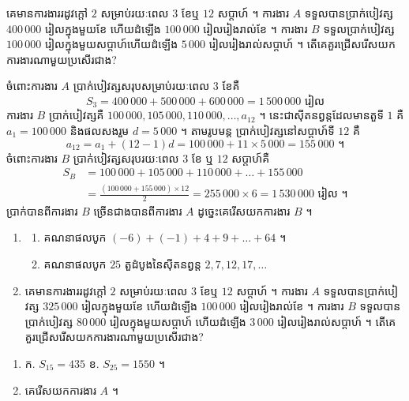 \begin{example}[លំហាត់គំរូ ៣]
គេមានការងាររដូវក្តៅ $2$ សម្រាប់រយៈពេល $3$ ខែឬ $12$ សប្តាហ៍ ។ ការងារ $A$ ទទួលបានប្រាក់បៀវត្ស $400\,000$ រៀលក្នុងមួយខែ ហើយដំឡើង $100\,000$ រៀលរៀងរាល់ខែ ។ ការងារ $B$ ទទួលប្រាក់បៀវត្ស $100\,000$ រៀលក្នុងមួយសប្តាហ៍ហើយដំឡើង $5\,000$ រៀលរៀងរាល់សប្តាហ៍ ។ តើគេគួរជ្រើសរើសយកការងារណាមួយប្រសើរជាង?
\end{example}
\ans
ចំពោះការងារ $A$ ប្រាក់បៀវត្សសរុបសម្រាប់រយៈពេល $3$ ខែគឺ
\[ S_3 = 400\,000 + 500\,000 + 600\,000 = 1\,500\,000 \text{ រៀល} \]
ការងារ $B$ ប្រាក់បៀវត្សគឺ $100\,000, 105\,000, 110\,000, \ldots, a_{12}$ ។ នេះជាស៊ីតនព្វន្តដែលមានតួទី $1$ គឺ $a_1 = 100\,000$ និងផលសងរួម $d = 5\,000$ ។ តាមរូបមន្ត ប្រាក់បៀវត្សនៅសប្តាហ៍ទី $12$ គឺ
\[ a_{12} = a_1 + (12 - 1)d = 100\,000 + 11 \times 5\,000 = 155\,000 \text{ ។} \]
ចំពោះការងារ $B$ ប្រាក់បៀវត្សសរុបរយៈពេល $3$ ខែ ឬ $12$ សប្តាហ៍គឺ
\[
\begin{aligned}
S_B &= 100\,000 + 105\,000 + 110\,000 + \ldots + 155\,000\\
&= \frac{(100\,000 + 155\,000) \times 12}{2} = 255\,000 \times 6 = 1\,530\,000 \text{ រៀល ។}
\end{aligned}
\]
ប្រាក់បានពីការងារ $B$ ច្រើនជាងបានពីការងារ $A$ ដូច្នេះគេរើសយកការងារ $B$ ។

\begin{pro}
\begin{enumerate}[1]
  \item \begin{enumerate}[a]
    \item គណនាផលបូក $(-6) + (-1) + 4 + 9 + \ldots + 64$ ។
    \item គណនាផលបូក $25$ តួដំបូងនៃស៊ីតនព្វន្ត $2, 7, 12, 17, \ldots$
  \end{enumerate}
  \item គេមានការងាររដូវក្តៅ $2$ សម្រាប់រយៈពេល $3$ ខែឬ $12$ សប្តាហ៍ ។ ការងារ $A$ ទទួលបានប្រាក់បៀវត្ស $325\,000$ រៀលក្នុងមួយខែ ហើយដំឡើង $100\,000$ រៀលរៀងរាល់ខែ ។ ការងារ $B$ ទទួលបានប្រាក់បៀវត្ស $80\,000$ រៀលក្នុងមួយសប្តាហ៍ ហើយដំឡើង $3\,000$ រៀលរៀងរាល់សប្តាហ៍ ។ តើគេគួរជ្រើសរើសយកការងារណាមួយប្រសើរជាង?
\end{enumerate}
\ans
\begin{enumerate}[1]
  \item ក. $S_{15} = 435$ \quad ខ. $S_{25} = 1550$ ។
  \item គេរើសយកការងារ $A$ ។
\end{enumerate}
\end{pro}

